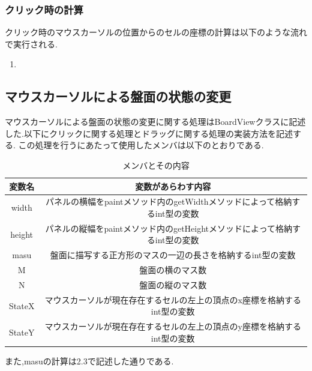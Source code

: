 \documentclass[dvipdfmx]{jarticle}
\begin{document}
\subsubsection{クリック時の計算}
クリック時のマウスカーソルの位置からのセルの座標の計算は以下のような流れで実行される.
\begin{enumerate}
    \item 
\end{enumerate}
\subsection{マウスカーソルによる盤面の状態の変更}

  マウスカーソルによる盤面の状態の変更に関する処理はBoardViewクラスに記述した.以下にクリックに関する処理とドラッグに関する処理の実装方法を記述する.
この処理を行うにあたって使用したメンバは以下のとおりである.

\begin{table}[h]
    \centering
    \begin{tabular}{|c||c|}
        \hline
        変数名 & 変数があらわす内容\\
        \hline\hline
        width & パネルの横幅をpaintメソッド内のgetWidthメソッドによって格納するint型の変数 \\\hline
        height & パネルの縦幅をpaintメソッド内のgetHeightメソッドによって格納するint型の変数\\\hline
        masu & 盤面に描写する正方形のマスの一辺の長さを格納するint型の変数\\\hline
        M & 盤面の横のマス数\\\hline
        N & 盤面の縦のマス数\\\hline
        StateX & マウスカーソルが現在存在するセルの左上の頂点のx座標を格納するint型の変数\\\hline
        StateY & マウスカーソルが現在存在するセルの左上の頂点のy座標を格納するint型の変数\\\hline
    \end{tabular}
    \caption{メンバとその内容}
\end{table}
また,masuの計算は2.3で記述した通りである.
\end{document}
